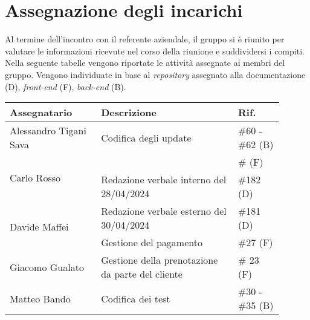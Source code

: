 \section{Assegnazione degli incarichi}
Al termine dell'incontro con il referente aziendale, il gruppo si è riunito per valutare le informazioni ricevute nel corso della riunione e suddividersi i compiti.\\
Nella seguente tabelle vengono riportate le attività assegnate ai membri del gruppo.
Vengono individuate in base al \textit{repository} assegnato alla documentazione (D), \textit{front-end} (F), \textit{back-end} (B).

\begin{center}
	{
		\renewcommand{\arraystretch}{1.5}
		\begin{tabular}{p{0.30\linewidth}|p{0.45\linewidth}|p{0.15\linewidth}}
			\textbf{Assegnatario}			& \textbf{Descrizione}						& \textbf{Rif.} \\
			\hline
			Alessandro Tigani Sava			&  Codifica degli update					& \#60 - \#62 (B)	\\
			\hline
			\multirow{2}{*}{Carlo Rosso}	& 	&\#  (F)	\\
			\cline{2-3}
											& Redazione verbale interno del 28/04/2024	& \#182	(D)	\\
			\hline
			\multirow{2}{*}{Davide Maffei}	& Redazione verbale esterno del 30/04/2024	& \#181  (D)	\\
			\cline{2-3}
											& Gestione del pagamento	& \#27 (F) 	\\
			\hline
			Giacomo Gualato					& Gestione della prenotazione da parte del cliente	& \# 23 (F)	\\
			\hline
			Matteo Bando					& Codifica dei test							& \#30 - \#35 (B)	\\
			\hline
		\end{tabular}
	}
\end{center}
